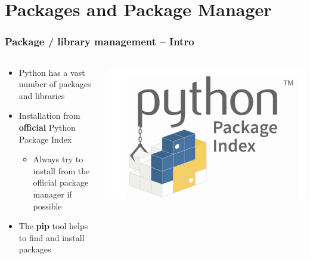 \documentclass[aspectratio=169,xcolor=dvipsnames,svgnames,x11names,fleqn]{beamer}
\begin{document}
\section{Packages and Package Manager}

\begin{frame}
    \sectionpage
\end{frame}


\begin{frame}
    \frametitle{Package / library management – Intro}
    \begin{columns}
        \begin{column}{0.6\textwidth}
            \begin{itemize}
                \item Python has a vast number of packages and libraries
                \item Installation from \textbf{official} Python Package Index
                \begin{itemize}
                    \item Always try to install from the official package manager if possible
                \end{itemize}
                \item The \textbf{pip} tool helps to find and install packages
            \end{itemize}
        \end{column}
        \begin{column}{0.4\textwidth}
            \centering
            \includegraphics[width=\textwidth]{figures/python_package_index_logo.png}
        \end{column}
    \end{columns}
\end{frame}
\end{document}
